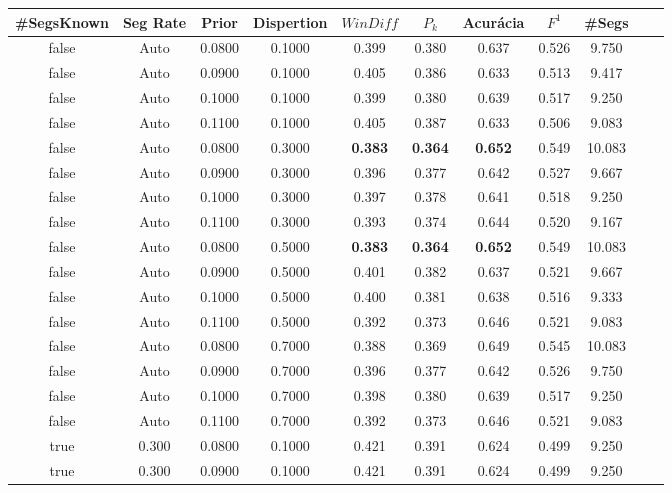 \documentclass{article}
\begin{document}
\begin{longtable}[c]{|c|c|c|c|c|c|c|c|c|c|c|} 
\hline 
 \#SegsKnown & Seg Rate & Prior & Dispertion & $WinDiff$ & $P_k$ & Acurácia & $F^1$ & \#Segs\\ \hline 
 false & Auto & 0.0800 & 0.1000 & 0.399 & 0.380 & 0.637 & 0.526 & 9.750  \\ \hline 
 false & Auto & 0.0900 & 0.1000 & 0.405 & 0.386 & 0.633 & 0.513 & 9.417  \\ \hline 
 false & Auto & 0.1000 & 0.1000 & 0.399 & 0.380 & 0.639 & 0.517 & 9.250  \\ \hline 
 false & Auto & 0.1100 & 0.1000 & 0.405 & 0.387 & 0.633 & 0.506 & 9.083  \\ \hline 
 false & Auto & 0.0800 & 0.3000 & \cellcolor{gray!20} \textbf{0.383} & \cellcolor{gray!20} \textbf{0.364} & \cellcolor{gray!20} \textbf{0.652} & 0.549 & 10.083  \\ \hline 
 false & Auto & 0.0900 & 0.3000 & 0.396 & 0.377 & 0.642 & 0.527 & 9.667  \\ \hline 
 false & Auto & 0.1000 & 0.3000 & 0.397 & 0.378 & 0.641 & 0.518 & 9.250  \\ \hline 
 false & Auto & 0.1100 & 0.3000 & 0.393 & 0.374 & 0.644 & 0.520 & 9.167  \\ \hline 
 false & Auto & 0.0800 & 0.5000 & \cellcolor{gray!20} \textbf{0.383} & \cellcolor{gray!20} \textbf{0.364} & \cellcolor{gray!20} \textbf{0.652} & 0.549 & 10.083  \\ \hline 
 false & Auto & 0.0900 & 0.5000 & 0.401 & 0.382 & 0.637 & 0.521 & 9.667  \\ \hline 
 false & Auto & 0.1000 & 0.5000 & 0.400 & 0.381 & 0.638 & 0.516 & 9.333  \\ \hline 
 false & Auto & 0.1100 & 0.5000 & 0.392 & 0.373 & 0.646 & 0.521 & 9.083  \\ \hline 
 false & Auto & 0.0800 & 0.7000 & 0.388 & 0.369 & 0.649 & 0.545 & 10.083  \\ \hline 
 false & Auto & 0.0900 & 0.7000 & 0.396 & 0.377 & 0.642 & 0.526 & 9.750  \\ \hline 
 false & Auto & 0.1000 & 0.7000 & 0.398 & 0.380 & 0.639 & 0.517 & 9.250  \\ \hline 
 false & Auto & 0.1100 & 0.7000 & 0.392 & 0.373 & 0.646 & 0.521 & 9.083  \\ \hline 
 true & 0.300 & 0.0800 & 0.1000 & 0.421 & 0.391 & 0.624 & 0.499 & 9.250  \\ \hline 
 true & 0.300 & 0.0900 & 0.1000 & 0.421 & 0.391 & 0.624 & 0.499 & 9.250  \\ \hline 

\end{longtable}
\end{document}
